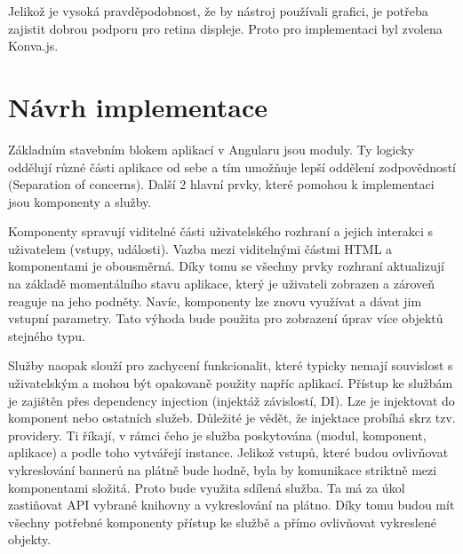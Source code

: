             Jelikož je vysoká pravděpodobnost, že by nástroj používali grafici, je potřeba zajistit dobrou podporu pro retina displeje.
            Proto pro implementaci byl zvolena Konva.js.

    \section{Návrh implementace}
    Základním stavebním blokem aplikací v Angularu jsou moduly. Ty logicky oddělují různé části aplikace od sebe a tím umožňuje lepší oddělení
     zodpovědností (Separation of concerns). Další 2 hlavní prvky, které pomohou k implementaci jsou komponenty a služby.  

    Komponenty spravují viditelné části uživatelského rozhraní a jejich interakci s uživatelem (vstupy, události).
    Vazba mezi viditelnými částmi HTML a komponentami je obousměrná. Díky tomu se všechny prvky rozhraní aktualizují na základě momentálního stavu aplikace,
    který je uživateli zobrazen a zároveň reaguje na jeho podněty. Navíc, komponenty lze znovu využívat a dávat jim vstupní parametry.
    Tato výhoda bude použita pro zobrazení úprav více objektů stejného typu. 

    Služby naopak slouží pro zachycení funkcionalit, které typicky nemají souvislost s uživatelským a mohou být opakovaně použity napříc aplikací.
    Přístup ke službám je zajištěn přes dependency injection (injektáž závislostí, DI). Lze je injektovat do komponent nebo ostatních služeb.
    Důležité je vědět, že injektace probíhá skrz tzv. providery. Ti říkají, v rámci čeho je služba poskytována (modul, komponent, aplikace) a
    podle toho vytvářejí instance. Jelikož vstupů, které budou ovlivňovat vykreslování bannerů na plátně bude hodně,
    byla by komunikace striktně mezi komponentami složitá. Proto bude využita sdílená služba.
    Ta má za úkol zastiňovat API vybrané knihovny a vykreslování na plátno. Díky tomu budou mít všechny potřebné komponenty přístup ke službě a
    přímo ovlivňovat vykreslené objekty.

